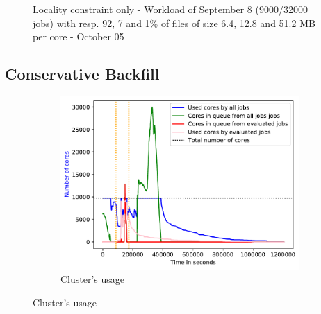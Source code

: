 \documentclass[a4paper]{article}
\begin{document}
\begin{figure}[H]
\caption{Locality constraint only - Workload of September 8 (9000/32000 jobs) with resp. 92, 7 and 1\% of files of size 6.4, 12.8 and 51.2 MB per core - October 05}\end{figure}


\subsection{Conservative Backfill}

\begin{figure}[H]\centering
\begin{subfigure}[b]{0.4\linewidth}\centering\includegraphics[width=1\linewidth]{MBSS/plot/2022-01-17->2022-01-17_V9271_Fcfs_Used_nodes_450_128_32_256_4_1024.pdf}\caption{Cluster's usage}\end{subfigure}

\end{figure}
\end{document}
